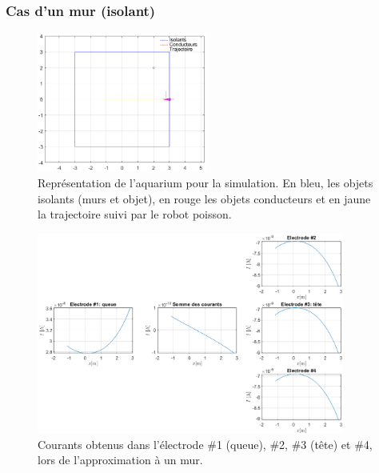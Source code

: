 \subsubsection{Cas d'un mur (isolant)}
\begin{figure}[h!]
    \centering
    \includegraphics[width=0.5\textwidth]{assets/plot_currents/approximation_wall/approximation_wall_trajectoire.png}
    \caption{Représentation de l'aquarium pour la simulation. En bleu, les objets isolants (murs et objet), en rouge les objets conducteurs et en jaune la trajectoire suivi par le robot poisson.}
    \label{fig:approximation_wall_trajectoire}
\end{figure}
\begin{figure}[h!]
    \centering
    \includegraphics[width=0.9\textwidth]{assets/plot_currents/approximation_wall/approximation_wall.png}
    \caption{Courants obtenus dans l'électrode \#1 (queue), \#2, \#3 (tête) et \#4, lors de l'approximation à un mur.}
    \label{fig:approximation_wall}
\end{figure}